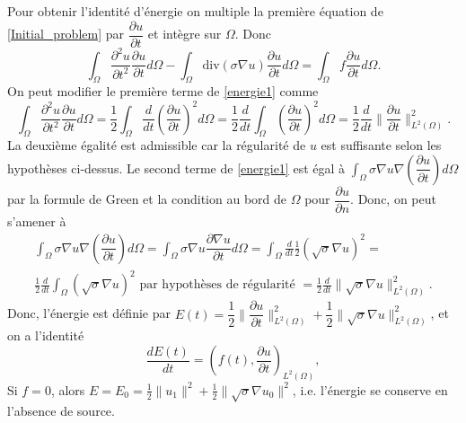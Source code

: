 \documentclass[12pt]{article}
\newcommand{\pd}[2]{ %
	\dfrac{\partial #1}{\partial #2}
}
\begin{document}
	
	Pour obtenir l'identité d'énergie on multiple la première équation de   \eqref{Initial_problem} par $\pd{u}{t}$ et intègre sur $\Omega$. Donc
	\begin{equation}
	\label{energie1}
	\int_\Omega{\dfrac{\partial^2u}{\partial t^2} \pd{u}{t} d\Omega} - \int_\Omega{\text{div}(\sigma \nabla u)\pd{u}{t} d\Omega} = \int_\Omega{f \pd{u}{t} d\Omega}.
	\end{equation}
	On peut modifier le première terme de \eqref{energie1} comme
	\begin{equation*}
	\int_\Omega{\dfrac{\partial^2u}{\partial t^2} \pd{u}{t} d\Omega}= \frac{1}{2}\int_\Omega{\frac{d}{dt}(\pd{u}{t})^2d\Omega} = \frac{1}{2}\frac{d}{dt}\int_\Omega{(\pd{u}{t})^2d\Omega} = \frac{1}{2}\frac{d}{dt}\|\pd{u}{t}\|^2_{L^2(\Omega)}.
	\end{equation*}
	La deuxième égalité est admissible car la régularité de $u$ est suffisante selon les hypothèses ci-dessus.
	Le second terme de \eqref{energie1} est égal à $\int_\Omega{\sigma \nabla u \nabla(\pd{u}{t}) d\Omega}$ par la formule de Green et la condition au bord de $\Omega$ pour $\pd{u}{n}$. Donc, on peut s'amener à
	\begin{multline*}
	\int_\Omega{\sigma \nabla u \nabla(\pd{u}{t}) d\Omega} = \int_\Omega{\sigma \nabla u\pd{\nabla u}{t} d\Omega} = \int_{\Omega}{\frac{d}{dt}\frac{1}{2}(\sqrt{\sigma}\nabla u)^2} =\\ \frac{1}{2}\frac{d}{dt}\int_{\Omega}{(\sqrt{\sigma}\nabla u)^2} \text{ par hypothèses de régularité }
	= \frac{1}{2}\frac{d}{dt}\|\sqrt{\sigma}\nabla u\|^2_{L^2(\Omega)}.
	\end{multline*}
	Donc, l'énergie est définie par $E(t) = \dfrac{1}{2}\|\pd{u}{t}\|^2_{L^2(\Omega)} + \dfrac{1}{2}\|\sqrt{\sigma}\nabla u\|^2_{L^2(\Omega)}$, et on a l'identité
	\begin{equation*}
	\dfrac{d E(t)}{dt} = (f(t),\pd{u}{t})_{L^2(\Omega)},
	\end{equation*}
	Si $f = 0$, alors $E = E_0 = \frac{1}{2}\|u_1\|^2 + \frac{1}{2}\|\sqrt{\sigma}\nabla u_0\|^2$, i.e. l'énergie se conserve en l'absence de source.
\end{document}
